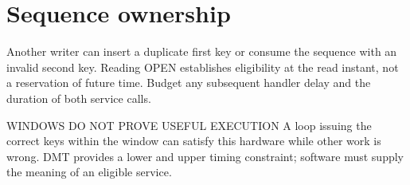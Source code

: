 \documentclass[10pt]{article}
\begin{document}
\section*{Sequence ownership}
Another writer can insert a duplicate first key or consume the sequence with an invalid second key. Reading OPEN establishes eligibility at the read instant, not a reservation of future time. Budget any subsequent handler delay and the duration of both service calls.
\begin{Notice}{WINDOWS DO NOT PROVE USEFUL EXECUTION}
A loop issuing the correct keys within the window can satisfy this hardware while other work is wrong. DMT provides a lower and upper timing constraint; software must supply the meaning of an eligible service.
\end{Notice}

\newpage
{}
\end{document}
